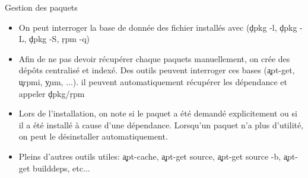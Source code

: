 \begin{frame}[fragile=singleslide]{Gestion des paquets}
  \begin{itemize}
  \item On  peut interroger  la base de  donnée des  fichier installés
    avec (\c{dpkg -l}, \c{dpkg -L}, \c{dpkg -S}, \c{rpm -q})
  \item Afin  de ne pas devoir récupérer  chaque paquets manuellement,
    on  crée des  dépôts  centralisé et  indexé.   Des outils  peuvent
    interroger ces  bases (\c{apt-get}, \c{urpmi},  \c{yum}, ...).  il
    peuvent  automatiquement  récupérer  les  dépendance  et  appeler
    \c{dpkg}/\c{rpm}
  \item Lors  de l'installation,  on note si  le paquet a  été demandé
    explicitement   ou  si   il   a  été   installé   à  cause   d'une
    dépendance.  Lorsqu'un  paquet  n'a  plus d'utilité,  on  peut  le
    désinstaller automatiquement.
  \item     Pleins    d'autres    outils     utiles:    \c{apt-cache},
    \c{apt-get source}, \c{apt-get  source -b}, \c{apt-get builddeps},
    etc...
  \end{itemize}
\end{frame}
